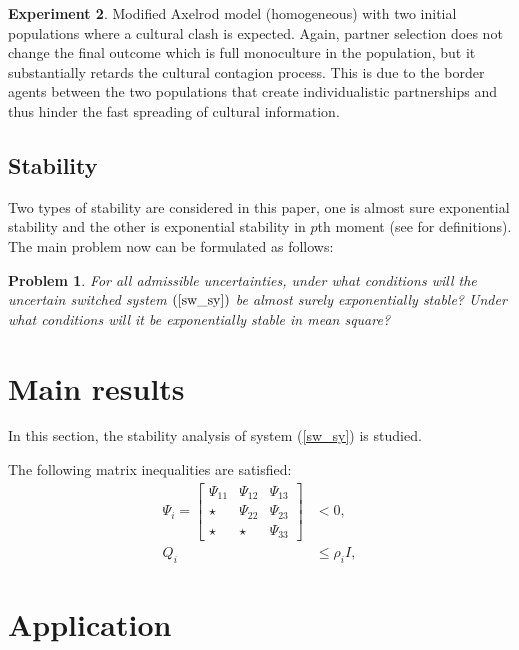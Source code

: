 \documentclass[a4paper,twocolumn,twoside,10pt]{article}
\newtheorem{prob}{Problem}[section]
\theoremstyle{definition}
\begin{document}
\textbf{Experiment 2}. Modified Axelrod model (homogeneous) with two initial populations where a
cultural clash is expected. Again, partner selection does not change the final outcome which is full
monoculture in the population, but it substantially retards the cultural contagion process. This is due
to the border agents between the two populations that create individualistic partnerships and thus
hinder the fast spreading of cultural information.\\

\subsection{Stability}

Two types of stability are considered in this paper, one is almost
sure exponential stability and the other is exponential stability in
$p$th moment (see \cite{Cheng} for definitions). The main problem
now can be formulated as follows:
\begin{prob}
For all admissible uncertainties, under what conditions will the
uncertain switched system $(\ref{sw_sy})$ be almost surely
exponentially stable? Under what conditions will it be exponentially
stable in mean square?
\end{prob}

\section{Main results}\label{sec3}
In this section, the stability analysis of system (\ref{sw_sy}) is
studied.

The following
matrix inequalities are satisfied:
\begin{align}
\Psi_i=\begin{bmatrix}
\Psi_{11}&\Psi_{12}&\Psi_{13}\\
\star&\Psi_{22}&\Psi_{23}\\
\star&\star&\Psi_{33}
\end{bmatrix}&<0,\label{ineq11}\\
Q_i&\leq\rho_iI\label{ineq12},
\end{align}


\section{Application}\label{sec4}
\end{document}

